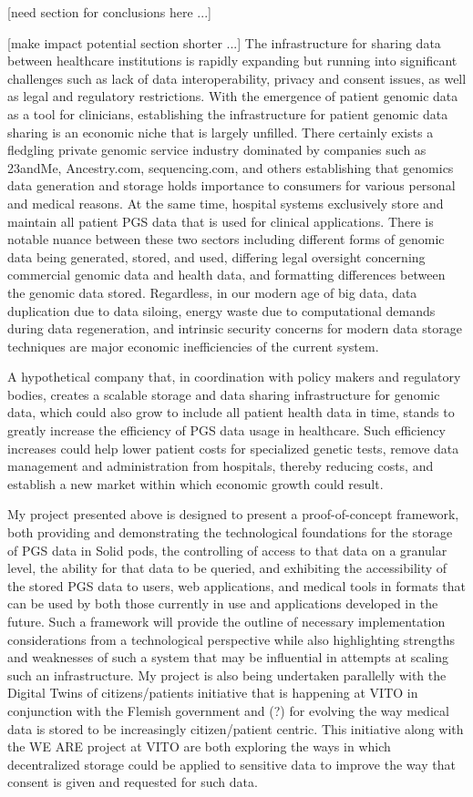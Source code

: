 \documentclass{article}
\begin{document}
[need section for conclusions here ...]


[make impact potential section shorter ...]
The infrastructure for sharing data between healthcare institutions is rapidly expanding but running into significant challenges such as lack of data interoperability, privacy and consent issues, as well as legal and regulatory restrictions. With the emergence of patient genomic data as a tool for clinicians, establishing the infrastructure for patient genomic data sharing is an economic niche that is largely unfilled. There certainly exists a fledgling private genomic service industry dominated by companies such as 23andMe, Ancestry.com, sequencing.com, and others establishing that genomics data generation and storage holds importance to consumers for various personal and medical reasons. At the same time, hospital systems exclusively store and maintain all patient PGS data that is used for clinical applications. There is notable nuance between these two sectors including different forms of genomic data being generated, stored, and used, differing legal oversight concerning commercial genomic data and health data, and formatting differences between the genomic data stored. Regardless, in our modern age of big data, data duplication due to data siloing, energy waste due to computational demands during data regeneration, and intrinsic security concerns for modern data storage techniques are major economic inefficiencies of the current system. 

A hypothetical company that, in coordination with policy makers and regulatory bodies, creates a scalable storage and data sharing infrastructure for genomic data, which could also grow to include all patient health data in time, stands to greatly increase the efficiency of PGS data usage in healthcare. Such efficiency increases could help lower patient costs for specialized genetic tests, remove data management and administration from hospitals, thereby reducing costs, and establish a new market within which economic growth could result. 

My project presented above is designed to present a proof-of-concept framework, both providing and demonstrating the technological foundations for the storage of PGS data in Solid pods, the controlling of access to that data on a granular level, the ability for that data to be queried, and exhibiting the accessibility of the stored PGS data to users, web applications, and medical tools in formats that can be used by both those currently in use and applications developed in the future. Such a framework will provide the outline of necessary implementation considerations from a technological perspective while also highlighting strengths and weaknesses of such a system that may be influential in attempts at scaling such an infrastructure. My project is also being undertaken parallelly with the Digital Twins of citizens/patients initiative that is happening at VITO in conjunction with the Flemish government and (?) for evolving the way medical data is stored to be increasingly citizen/patient centric. This initiative along with the WE ARE project at VITO are both exploring the ways in which decentralized storage could be applied to sensitive data to improve the way that consent is given and requested for such data. 
\end{document}
